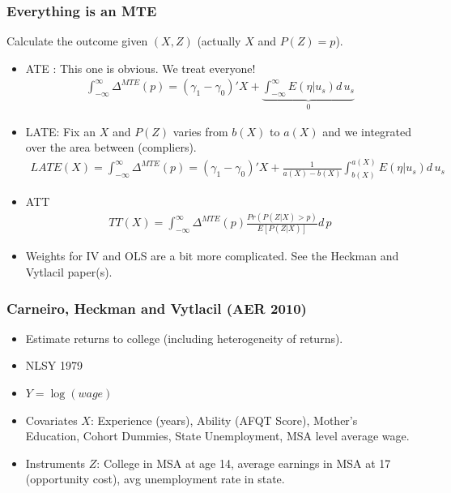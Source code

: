 \begin{frame}
\footnotesize
\frametitle{Everything is an MTE}
Calculate the outcome given $(X,Z)$ (actually $X$ and $P(Z)=p$).
\begin{itemize}
\item ATE : This one is obvious. We treat everyone!
\begin{eqnarray*}
\int_{-\infty}^{\infty} \Delta^{MTE}(p) = (\gamma_1 - \gamma_0)'X + \underbrace{\int_{-\infty}^{\infty} E(\eta | u_s) d\, u_s}_{0}
\end{eqnarray*}
\item LATE: Fix an $X$ and $P(Z)$ varies from $b(X)$ to $a(X)$ and we integrated over the area between (compliers).
\begin{eqnarray*}
LATE(X)=\int_{-\infty}^{\infty} \Delta^{MTE}(p) =  (\gamma_1 - \gamma_0)'X + \frac{1}{a(X)-b(X)} \int_{b(X)}^{a(X)} E(\eta | u_s) d\, u_s
\end{eqnarray*}

\item ATT 
\begin{eqnarray*}
TT(X)=\int_{-\infty}^{\infty} \Delta^{MTE}(p) \frac{Pr(P(Z | X) > p)}{E[P(Z | X)]} d\,p
\end{eqnarray*}

\item Weights for IV and OLS are a bit more complicated. See the Heckman and Vytlacil paper(s).
\end{itemize}
\end{frame}

\begin{frame}
\frametitle{Carneiro, Heckman and Vytlacil (AER 2010)}
\begin{itemize}
\item Estimate returns to college (including heterogeneity of returns).
\item NLSY 1979
\item $Y = \log(wage)$
\item Covariates $X$: Experience (years), Ability (AFQT Score), Mother's Education, Cohort Dummies, State Unemployment, MSA level average wage.
\item Instruments $Z$: College in MSA at age 14, average earnings in MSA at 17 (opportunity cost), avg unemployment rate in state.
\end{itemize}
\end{frame}


